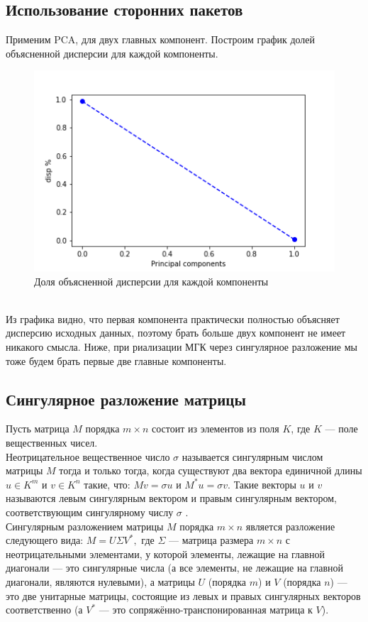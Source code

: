 \documentclass[a4]{article}
\begin{document}
	\subsection{Использование сторонних пакетов}
	Применим PCA, для двух главных компонент. Построим график долей объясненной дисперсии для каждой компоненты.
	\begin{figure}[h!]
		\includegraphics[width=\textwidth]{disp_cutoff.png}\caption[Доля объясненной дисперсии для каждой компоненты]{Доля объясненной дисперсии для каждой компоненты}
	\end{figure}\\
	Из графика видно, что первая компонента практически полностью объясняет дисперсию исходных данных, поэтому брать больше двух компонент не имеет никакого смысла. Ниже, при риализации МГК через сингулярное разложение мы тоже будем брать первые две главные компоненты.
	\subsection{Сингулярное разложение матрицы}
	Пусть матрица $M$ порядка $m\times n$ состоит из элементов из поля $K$, где $K$ — поле вещественных чисел. \\
	Неотрицательное вещественное число $\sigma$  называется сингулярным числом матрицы $M$ тогда и только тогда, когда существуют два вектора единичной длины $u\in K^{m}$ и $v\in K^{n}$ такие, что:
	$ Mv=\sigma u$ и $M^{*}u=\sigma v$.
	Такие векторы $u$ и $v$ называются левым сингулярным вектором и правым сингулярным вектором, соответствующим сингулярному числу $\sigma$ .\\
	Сингулярным разложением матрицы $M$ порядка $m\times n$ является разложение следующего вида:
	$M=U\Sigma V^{*},$
	где $\Sigma$  — матрица размера $m\times n$ с неотрицательными элементами, у которой элементы, лежащие на главной диагонали — это сингулярные числа (а все элементы, не лежащие на главной диагонали, являются нулевыми), а матрицы $U$ (порядка $m$) и $V$ (порядка $n$) — это две унитарные матрицы, состоящие из левых и правых сингулярных векторов соответственно (а $V^*$ — это сопряжённо-транспонированная матрица к $V$).
\end{document}
